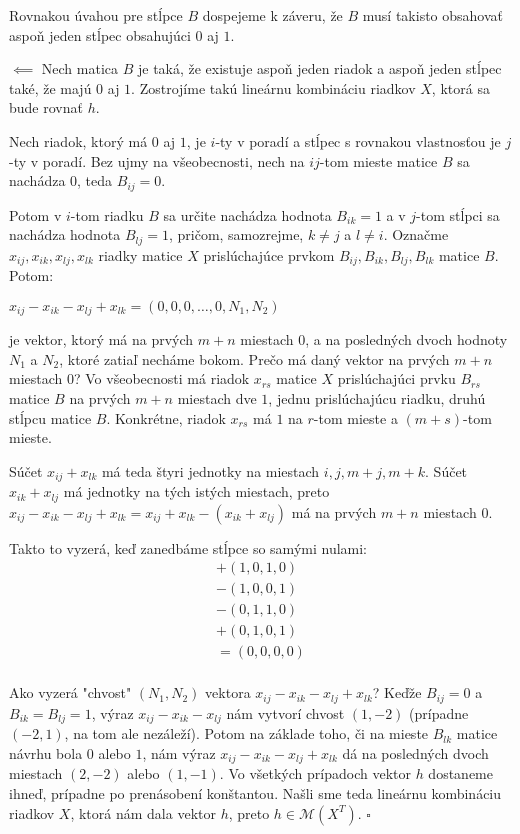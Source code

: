 \begin{dokaz}
Rovnakou úvahou pre stĺpce $B$ dospejeme k záveru,
že $B$ musí takisto obsahovať aspoň jeden stĺpec obsahujúci $0$ aj $1$.

$\boxed{\impliedby}$ Nech matica $B$ je taká, že existuje aspoň jeden riadok a aspoň jeden stĺpec také, že majú $0$ aj $1$.
Zostrojíme takú lineárnu kombináciu riadkov $X$, ktorá sa bude rovnať $h$.

Nech riadok, ktorý má $0$ aj $1$, je $i$-ty v poradí a stĺpec s rovnakou vlastnosťou je $j$-ty v poradí.
Bez ujmy na všeobecnosti, nech na $ij$-tom mieste matice $B$ sa nachádza $0$, teda $B_{ij} = 0$.

Potom v $i$-tom riadku $B$ sa určite nachádza hodnota $B_{ik} = 1$ a v $j$-tom stĺpci sa nachádza hodnota $B_{lj} = 1$,
pričom, samozrejme, $k \neq j$ a $l \neq i$.
Označme $x_{ij}, x_{ik}, x_{lj}, x_{lk}$ riadky matice $X$ prislúchajúce prvkom $B_{ij}, B_{ik}, B_{lj}, B_{lk}$ matice $B$. Potom:

\begin{center}
$
x_{ij} - x_{ik} - x_{lj} + x_{lk} = (0, 0, 0, \ldots, 0, N_1, N_2)
$
\end{center}
je vektor, ktorý má na prvých $m + n$ miestach $0$, a na posledných dvoch hodnoty $N_1$ a $N_2$, ktoré zatiaľ necháme bokom.
Prečo má daný vektor na prvých $m + n$ miestach $0$?
Vo všeobecnosti má riadok $x_{rs}$ matice $X$ prislúchajúci prvku $B_{rs}$ matice $B$ na prvých $m + n$ miestach dve $1$,
jednu prislúchajúcu riadku, druhú stĺpcu matice $B$. Konkrétne, riadok $x_{rs}$ má $1$ na $r$-tom mieste a $(m + s)$-tom mieste.

Súčet $x_{ij} + x_{lk}$ má teda štyri jednotky na miestach $i, j, m + j, m + k$.
Súčet $x_{ik} + x_{lj}$ má jednotky na tých istých miestach, 
preto $x_{ij} - x_{ik} - x_{lj} + x_{lk} = x_{ij} + x_{lk} - (x_{ik} + x_{lj})$ má na prvých $m + n$ miestach $0$.

Takto to vyzerá, keď zanedbáme stĺpce so samými nulami:
\[
\begin{split}
+(1, 0, 1, 0) \\
-(1, 0, 0, 1) \\
-(0, 1, 1, 0) \\
+(0, 1, 0, 1) \\
=(0, 0, 0, 0) \\
\end{split}
\]

Ako vyzerá "chvost" $(N_1, N_2)$ vektora $x_{ij} - x_{ik} - x_{lj} + x_{lk}$? Keďže $B_{ij} = 0$ a $B_{ik} = B_{lj} = 1$,
výraz $x_{ij} - x_{ik} - x_{lj}$ nám vytvorí chvost $(1, -2)$ (prípadne $(-2, 1)$, na tom ale nezáleží).
Potom na základe toho, či na mieste $B_{lk}$ matice návrhu bola $0$ alebo $1$,
nám výraz $x_{ij} - x_{ik} - x_{lj} + x_{lk}$ dá na posledných dvoch miestach $(2, -2)$ alebo $(1, -1)$.
Vo všetkých prípadoch vektor $h$ dostaneme ihneď, prípadne po prenásobení konštantou.
Našli sme teda lineárnu kombináciu riadkov $X$, ktorá nám dala vektor $h$, preto $h \in \mathcal{M}(X^T)$. $\square$

\end{dokaz}


